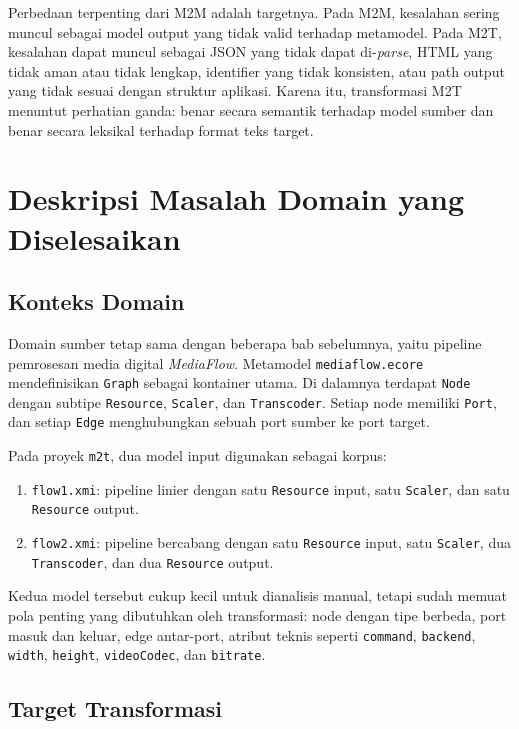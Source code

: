 Perbedaan terpenting dari M2M adalah targetnya. Pada M2M, kesalahan sering muncul sebagai model output yang tidak valid terhadap metamodel. Pada M2T, kesalahan dapat muncul sebagai JSON yang tidak dapat di-\textit{parse}, HTML yang tidak aman atau tidak lengkap, identifier yang tidak konsisten, atau path output yang tidak sesuai dengan struktur aplikasi. Karena itu, transformasi M2T menuntut perhatian ganda: benar secara semantik terhadap model sumber dan benar secara leksikal terhadap format teks target.

\section{Deskripsi Masalah Domain yang Diselesaikan}

\subsection{Konteks Domain}

Domain sumber tetap sama dengan beberapa bab sebelumnya, yaitu pipeline pemrosesan media digital \textit{MediaFlow}. Metamodel \texttt{mediaflow.ecore} mendefinisikan \texttt{Graph} sebagai kontainer utama. Di dalamnya terdapat \texttt{Node} dengan subtipe \texttt{Resource}, \texttt{Scaler}, dan \texttt{Transcoder}. Setiap node memiliki \texttt{Port}, dan setiap \texttt{Edge} menghubungkan sebuah port sumber ke port target.

Pada proyek \texttt{m2t}, dua model input digunakan sebagai korpus:
\begin{enumerate}
  \item \texttt{flow1.xmi}: pipeline linier dengan satu \texttt{Resource} input, satu \texttt{Scaler}, dan satu \texttt{Resource} output.
  \item \texttt{flow2.xmi}: pipeline bercabang dengan satu \texttt{Resource} input, satu \texttt{Scaler}, dua \texttt{Transcoder}, dan dua \texttt{Resource} output.
\end{enumerate}

Kedua model tersebut cukup kecil untuk dianalisis manual, tetapi sudah memuat pola penting yang dibutuhkan oleh transformasi: node dengan tipe berbeda, port masuk dan keluar, edge antar-port, atribut teknis seperti \texttt{command}, \texttt{backend}, \texttt{width}, \texttt{height}, \texttt{videoCodec}, dan \texttt{bitrate}.

\subsection{Target Transformasi}

